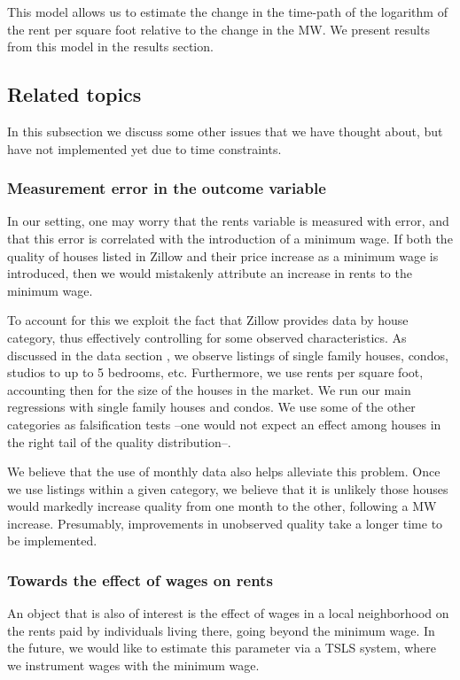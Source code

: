 This model allows us to estimate the change in the time-path of the logarithm of the rent per square foot relative to the change in the MW. We present results from this model in the results section. 

\subsection{Related topics} \label{subsec:empirical_strategy/related-topics}

    In this subsection we discuss some other issues that we have thought about, but have not implemented yet due to time constraints.

    \subsubsection{Measurement error in the outcome variable}

    In our setting, one may worry that the rents variable is measured with error, and that this error is correlated with the introduction of a minimum wage. If both the quality of houses listed in Zillow and their price increase as a minimum wage is introduced, then we would mistakenly attribute an increase in rents to the minimum wage.%
    
    To account for this we exploit the fact that Zillow provides data by house category, thus effectively controlling for some observed characteristics. As discussed in the data section 
    , we observe listings of single family houses, condos, studios to up to 5 bedrooms, etc. Furthermore, we use rents per square foot, accounting then for the size of the houses in the market. We run our main regressions with single family houses and condos. We use some of the other categories as falsification tests --one would not expect an effect among houses in the right tail of the quality distribution--.
    
    We believe that the use of monthly data also helps alleviate this problem. Once we use listings within a given category, we believe that it is unlikely those houses would markedly increase quality from one month to the other, following a MW increase. Presumably, improvements in unobserved quality take a longer time to be implemented.

    \subsubsection{Towards the effect of wages on rents}
    
    An object that is also of interest is the effect of wages in a local neighborhood on the rents paid by individuals living there, going beyond the minimum wage. In the future, we would like to estimate this parameter via a TSLS system, where we instrument wages with the minimum wage.
